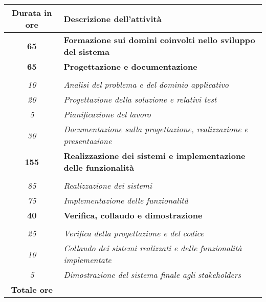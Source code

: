 \begin{tabularx}{\textwidth}{|c|X|}
	\hline
	\textbf{Durata in ore} & \textbf{Descrizione dell'attività} \\\hline
	\textbf{65} & \textbf{Formazione sui domini coinvolti nello sviluppo del sistema} \\	 
    \hline

    \textbf{65} & \textbf{Progettazione e documentazione} \\ \hdashline 
    \multirow{3}{0cm}\\ 
    \textit{10} & 
    \textit{Analisi del problema e del dominio applicativo} \\
    \textit{20} & 
    \textit{Progettazione della soluzione e relativi test} \\
    \textit{5} & 
    \textit{Pianificazione del lavoro} \\
    \textit{30} & 
    \textit{Documentazione sulla progettazione, realizzazione e presentazione} \\
    \hline
    
    \textbf{155} & \textbf{Realizzazione dei sistemi e implementazione delle funzionalità} \\ \hdashline 
    \multirow{3}{0cm}\\ 
    \textit{85} & 
    \textit{Realizzazione dei sistemi} \\
    \textit{75} & 
    \textit{Implementazione delle funzionalità} \\
    \hline

    \textbf{40} & \textbf{Verifica, collaudo e dimostrazione}  \\ \hdashline 
    \multirow{4}{0cm}\\ 
    \textit{25} & 
    \textit{Verifica della progettazione e del codice} \\
    \textit{10} & 
    \textit{Collaudo dei sistemi realizzati e delle funzionalità implementate} \\
    \textit{5} & 
    \textit{Dimostrazione del sistema finale agli stakeholders} \\
    \hline
	
	\textbf{Totale ore} & \multicolumn{1}{|c|}{\textbf{\totaleOre}} \\\hline
\end{tabularx}